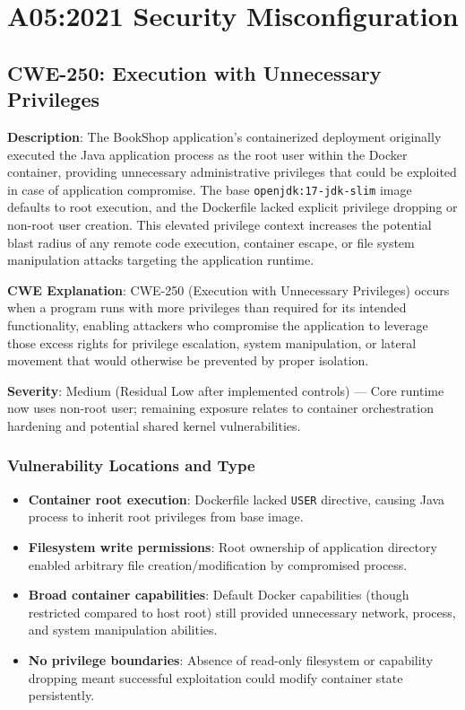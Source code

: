 \documentclass[]{UCD_CS_FYP_Report}
\begin{document}
\chapter{A05:2021 Security Misconfiguration}


\section{CWE-250: Execution with Unnecessary Privileges}

\textbf{Description}: The BookShop application's containerized deployment originally executed the Java application process as the root user within the Docker container, providing unnecessary administrative privileges that could be exploited in case of application compromise. The base \texttt{openjdk:17-jdk-slim} image defaults to root execution, and the Dockerfile lacked explicit privilege dropping or non-root user creation. This elevated privilege context increases the potential blast radius of any remote code execution, container escape, or file system manipulation attacks targeting the application runtime.

\textbf{CWE Explanation}: CWE-250 (Execution with Unnecessary Privileges) occurs when a program runs with more privileges than required for its intended functionality, enabling attackers who compromise the application to leverage those excess rights for privilege escalation, system manipulation, or lateral movement that would otherwise be prevented by proper isolation.

\textbf{Severity}: Medium (Residual Low after implemented controls) — Core runtime now uses non-root user; remaining exposure relates to container orchestration hardening and potential shared kernel vulnerabilities.

\subsection*{Vulnerability Locations and Type}
\begin{itemize}
  \item \textbf{Container root execution}: Dockerfile lacked \texttt{USER} directive, causing Java process to inherit root privileges from base image.
  \item \textbf{Filesystem write permissions}: Root ownership of application directory enabled arbitrary file creation/modification by compromised process.
  \item \textbf{Broad container capabilities}: Default Docker capabilities (though restricted compared to host root) still provided unnecessary network, process, and system manipulation abilities.
  \item \textbf{No privilege boundaries}: Absence of read-only filesystem or capability dropping meant successful exploitation could modify container state persistently.
\end{itemize}
\end{document}
